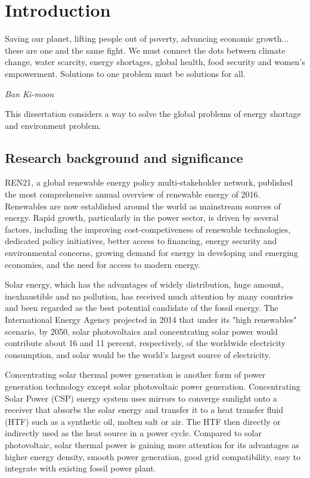 \chapter{Introduction}\label{chapter:Introduction}
\epigraph{Saving our planet, lifting people out of poverty, advancing economic growth... these are one and the same fight. We must connect the dots between climate change, water scarcity, energy shortages, global health, food security and women's empowerment. Solutions to one problem must be solutions for all.}{\textit{Ban Ki-moon}}

This dissertation considers a way to solve the global problems of energy shortage and environment problem.

\section{Research background and significance}

REN21, a global renewable energy policy multi-stakeholder network, published the most comprehensive annual overview of renewable energy of 2016.~\cite{REN21}
Renewables are now established around the world as mainstream sources of energy. Rapid growth, particularly in the power sector, is driven by several factors, including the improving cost-competiveness of renewable technologies, dedicated policy initiatives, better access to financing, energy security and environmental concerns, growing demand for energy in developing and emerging economies, and the need for access to modern energy. 

Solar energy, which has the advantages of widely distribution, huge amount, inexhaustible and no pollution, has received much attention by many countries and been regarded as the best potential candidate of the fossil energy. The International Energy Agency projected in 2014 that under its "high renewables" scenario, by 2050, solar photovoltaics and concentrating solar power would contribute about 16 and 11 percent, respectively, of the worldwide electricity consumption, and solar would be the world's largest source of electricity.~\cite{IEA2014}

Concentrating solar thermal power generation is another form of power generation technology except solar photovoltaic power generation. Concentrating Solar Power (CSP) energy system uses mirrors to converge sunlight onto a receiver that absorbs the solar energy and transfer it to a heat transfer fluid (HTF) such as a synthetic oil, molten salt or air. The HTF then directly or indirectly used as the heat source in a power cycle.
Compared to solar photovoltaic, solar thermal power is gaining more attention for its advantages as higher energy density, smooth power generation, good grid compatibility, easy to integrate with existing fossil power plant. 


